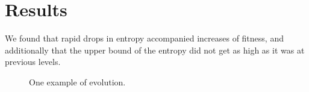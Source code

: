 \documentclass[11pt]{article}
\begin{document}
\section{Results}
\label{sec:orged0917a}
We found that rapid drops in entropy accompanied increases of fitness, and
additionally that the upper bound of the entropy did not get as high
as it was at previous levels.


\begin{figure}
  \label{fig:gen-info_pid3095791}
  \centering
  \caption{One example of evolution.}
  \label{fig:multi-step}
\end{figure}

\begin{figure}
\end{figure}
\end{document}
